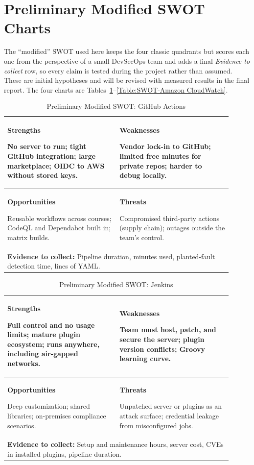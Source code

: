 \section{Preliminary Modified SWOT Charts}
The ``modified'' SWOT used here keeps the four classic quadrants but scores
each one from the perspective of a small DevSecOps team and adds a final
\emph{Evidence to collect} row, so every claim is tested during the project
rather than assumed. These are initial hypotheses and will be revised with
measured results in the final report. The four charts are
Tables~\ref{Table:SWOT-GitHub Actions}--\ref{Table:SWOT-Amazon CloudWatch}.

\newcommand{\SWOTChart}[6]{%
\begin{table}[htbp]
\centering
\caption{Preliminary Modified SWOT: #1}\label{Table:SWOT-#1}
\begin{tabular}{|p{0.455\linewidth}|p{0.455\linewidth}|}
\hline
\textbf{Strengths}\par #2 & \textbf{Weaknesses}\par #3\\ \hline
\textbf{Opportunities}\par #4 & \textbf{Threats}\par #5\\ \hline
\multicolumn{2}{|p{\dimexpr0.91\linewidth+2\tabcolsep+\arrayrulewidth\relax}|}{\textbf{Evidence to collect:} #6}\\ \hline
\end{tabular}
\end{table}}

\SWOTChart{GitHub Actions}
{No server to run; tight GitHub integration; large marketplace; OIDC to AWS without stored keys.}
{Vendor lock-in to GitHub; limited free minutes for private repos; harder to debug locally.}
{Reusable workflows across courses; CodeQL and Dependabot built in; matrix builds.}
{Compromised third-party actions (supply chain); outages outside the team's control.}
{Pipeline duration, minutes used, planted-fault detection time, lines of YAML.}

\SWOTChart{Jenkins}
{Full control and no usage limits; mature plugin ecosystem; runs anywhere, including air-gapped networks.}
{Team must host, patch, and secure the server; plugin version conflicts; Groovy learning curve.}
{Deep customization; shared libraries; on-premises compliance scenarios.}
{Unpatched server or plugins as an attack surface; credential leakage from misconfigured jobs.}
{Setup and maintenance hours, server cost, CVEs in installed plugins, pipeline duration.}

